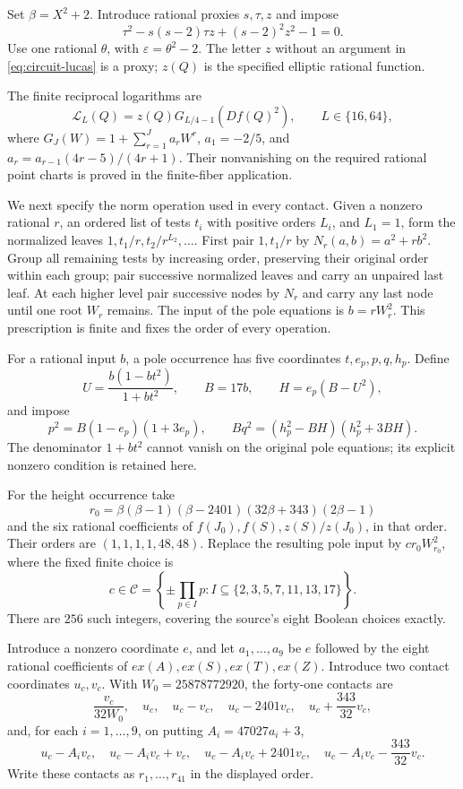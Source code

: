 \documentclass[11pt]{article}
\theoremstyle{definition}
\begin{document}
Set $\beta=X^2+2$. Introduce rational proxies $s,\tau,z$ and impose
\begin{equation}\label{eq:circuit-lucas}
 \tau^2-s(s-2)\tau z+(s-2)^2z^2-1=0.
\end{equation}
Use one rational $\theta$, with $\varepsilon=\theta^2-2$.
The letter $z$ without an argument in \eqref{eq:circuit-lucas}
is a proxy; $z(Q)$ is the specified elliptic rational function.

The finite reciprocal logarithms are
\[
 \mathcal L_L(Q)=z(Q)G_{L/4-1}(Df(Q)^2),
 \qquad L\in\{16,64\},
\]
where $G_J(W)=1+\sum_{r=1}^J a_rW^r$,
$a_1=-2/5$, and $a_r=a_{r-1}(4r-5)/(4r+1)$.
Their nonvanishing on the required rational point charts is proved
in the finite-fiber application.

We next specify the norm operation used in every contact. Given a
nonzero rational $r$, an ordered list of tests $t_i$ with positive
orders $L_i$, and $L_1=1$, form the normalized leaves
$1,t_1/r,t_2/r^{L_2},\ldots$. First pair $1,t_1/r$ by
$N_r(a,b)=a^2+rb^2$. Group all remaining tests by increasing order,
preserving their original order within each group; pair successive
normalized leaves and carry an unpaired last leaf. At each higher
level pair successive nodes by $N_r$ and carry any last node until
one root $W_r$ remains. The input of the pole equations is $b=rW_r^2$.
This prescription is finite and fixes the order of every operation.

For a rational input $b$, a pole occurrence has five coordinates
$t,e_p,p,q,h_p$. Define
\[
 U=\frac{b(1-bt^2)}{1+bt^2},\qquad B=17b,
 \qquad H=e_p(B-U^2),
\]
and impose
\begin{equation}\label{eq:circuit-pole}
 p^2=B(1-e_p)(1+3e_p),\qquad
 Bq^2=(h_p^2-BH)(h_p^2+3BH).
\end{equation}
The denominator $1+bt^2$ cannot vanish on the original pole equations;
its explicit nonzero condition is retained here.

For the height occurrence take
\[
 r_0=\beta(\beta-1)(\beta-2401)(32\beta+343)(2\beta-1)
\]
and the six rational coefficients of
$f(J_0),f(S),z(S)/z(J_0)$, in that order. Their orders are
$(1,1,1,1,48,48)$. Replace the resulting pole input by $c r_0W_{r_0}^2$,
where the fixed finite choice is
\[
 c\in\mathcal C=\left\{\pm\prod_{p\in I}p:
 I\subseteq\{2,3,5,7,11,13,17\}\right\}.
\]
There are $256$ such integers, covering the source's eight Boolean
choices exactly.

Introduce a nonzero coordinate $e$, and let $a_1,\ldots,a_9$ be
$e$ followed by the eight rational coefficients of
$ex(A),ex(S),ex(T),ex(Z)$. Introduce two contact coordinates $u_c,v_c$.
With $W_0=25878772920$, the forty-one contacts are
\[
 \frac{v_c}{32W_0},\quad u_c,\quad u_c-v_c,\quad
 u_c-2401v_c,\quad u_c+\frac{343}{32}v_c,
\]
and, for each $i=1,\ldots,9$, on putting $A_i=47027a_i+3$,
\[
 u_c-A_iv_c,\quad u_c-A_iv_c+v_c,\quad
 u_c-A_iv_c+2401v_c,\quad
 u_c-A_iv_c-\frac{343}{32}v_c.
\]
Write these contacts as $r_1,\ldots,r_{41}$ in the displayed order.
\end{document}
